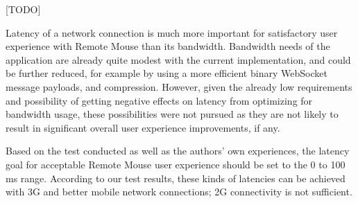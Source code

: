 \documentclass[a4paper,english,twocolumn]{article}
\begin{document}
[TODO]

Latency of a network connection is much more important for
satisfactory user experience with Remote Mouse than its
bandwidth. Bandwidth needs of the application are already quite modest
with the current implementation, and could be further reduced, for
example by using a more efficient binary WebSocket message payloads,
and compression. However, given the already low requirements and
possibility of getting negative effects on latency from optimizing for
bandwidth usage, these possibilities were not pursued as they are not
likely to result in significant overall user experience improvements,
if any.

Based on the test conducted as well as the authors' own experiences,
the latency goal for acceptable Remote Mouse user experience should be
set to the 0 to 100 ms range. According to our test results, these
kinds of latencies can be achieved with 3G and better mobile network
connections; 2G connectivity is not sufficient.






\end{document}
